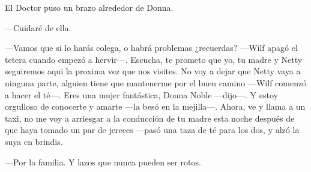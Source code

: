 El Doctor puso un brazo alrededor de Donna.

---Cuidaré de ella.

---Vamos que si lo harás colega, o habrá problemas ¿recuerdas? ---Wilf
apagó el tetera cuando empezó a hervir---. Escucha, te prometo que yo,
tu madre y Netty seguiremos aqui la proxima vez que nos visites. No voy
a dejar que Netty vaya a ninguna parte, alguien tiene que mantenerme por
el buen camino ---Wilf comenzó a hacer el té---. Eres una mujer
fantástica, Donna Noble ---dijo---. Y estoy orgulloso de conocerte y
amarte ---la besó en la mejilla---. Ahora, ve y llama a un taxi, no me
voy a arriesgar a la conducción de tu madre esta noche después de que
haya tomado un par de jereces ---pasó una taza de té para los dos, y
alzó la suya en brindis.

---Por la familia. Y lazos que nunca pueden ser rotos.
